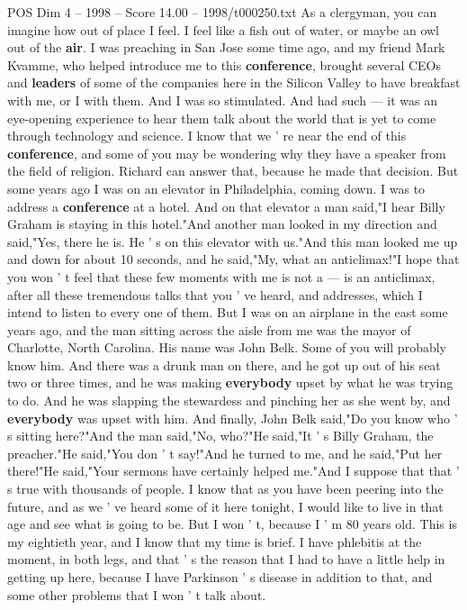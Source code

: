 \begin{textsample}{POS Dim 4 – 1998 – Score 14.00 – 1998/t000250.txt}  \label{ex:f4_pos_012}
As a clergyman, you can imagine how out of place I feel.
I feel like a fish out of water, or maybe an owl out of the \textbf{air}.
I was preaching in San Jose some time ago, and my friend Mark Kvamme, who helped introduce me to this \textbf{conference}, brought several CEOs and \textbf{leaders} of some of the companies here in the Silicon Valley to have breakfast with me, or I with them.
And I was so stimulated.
And had such — it was an eye-opening experience to hear them talk about the world that is yet to come through technology and science.
I know that we ' re near the end of this \textbf{conference}, and some of you may be wondering why they have a speaker from the field of religion.
Richard can answer that, because he made that decision.
But some years ago I was on an elevator in Philadelphia, coming down.
I was to address a \textbf{conference} at a hotel.
And on that elevator a man said,"I hear Billy Graham is staying in this hotel."And another man looked in my direction and said,"Yes, there he is.
He ' s on this elevator with us."And this man looked me up and down for about 10 seconds, and he said,"My, what an anticlimax!"I hope that you won ' t feel that these few moments with me is not a — is an anticlimax, after all these tremendous talks that you ' ve heard, and addresses, which I intend to listen to every one of them.
But I was on an airplane in the east some years ago, and the man sitting across the aisle from me was the mayor of Charlotte, North Carolina.
His name was John Belk.
Some of you will probably know him.
And there was a drunk man on there, and he got up out of his seat two or three times, and he was making \textbf{everybody} upset by what he was trying to do.
And he was slapping the stewardess and pinching her as she went by, and \textbf{everybody} was upset with him.
And finally, John Belk said,"Do you know who ' s sitting here?"And the man said,"No, who?"He said,"It ' s Billy Graham, the preacher."He said,"You don ' t say!"And he turned to me, and he said,"Put her there!"He said,"Your sermons have certainly helped me."And I suppose that that ' s true with thousands of people.
I know that as you have been peering into the future, and as we ' ve heard some of it here tonight, I would like to live in that age and see what is going to be.
But I won ' t, because I ' m 80 years old.
This is my eightieth year, and I know that my time is brief.
I have phlebitis at the moment, in both legs, and that ' s the reason that I had to have a little help in getting up here, because I have Parkinson ' s disease in addition to that, and some other problems that I won ' t talk about.

\end{textsample}

